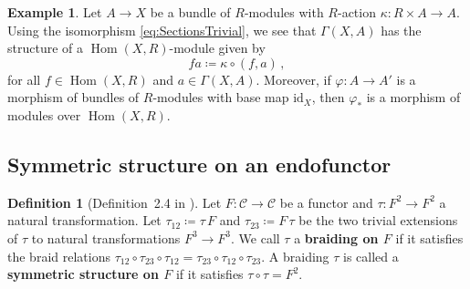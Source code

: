 \documentclass[12pt,reqno, a4paper]{amsart}
\numberwithin{equation}{section}
\theoremstyle{plain}
\theoremstyle{definition}
\newtheorem{Definition}[Theorem]{Definition}
\newtheorem{Example}[Theorem]{Example}
\theoremstyle{remark}
\DeclareMathOperator{\Hom}{Hom}
\newcommand{\calC}{\mathcal{C}}
\newcommand{\id}{\mathrm{id}}
\newcommand{\pr}{\mathrm{pr}}
\renewcommand{\phi}{\varphi}
\begin{document}
\begin{Example}
Let $A \to X$ be a bundle of $R$-modules with $R$-action $\kappa: R \times A \to A$. Using the isomorphism \eqref{eq:SectionsTrivial}, we see that $\Gamma(X,A)$ has the structure of a $\Hom(X,R)$-module given by
\begin{equation}
\label{eq:SectionsModuleStr}
  fa \coloneqq \kappa \circ (f,a) \,,
\end{equation}
for all $f \in \Hom(X,R)$ and $a \in \Gamma(X,A)$. Moreover, if $\phi: A \to A'$ is a morphism of bundles of $R$-modules with base map $\id_X$, then $\phi_*$ is a morphism of modules over $\Hom(X,R)$.
\end{Example}



\subsection{Symmetric structure on an endofunctor}




\begin{Definition}[Definition~2.4 in \cite{AintablianBlohmann:2026}]
\label{def:SymStruc}
Let $F: \calC \to \calC$ be a functor and $\tau: F^2 \to F^2$ a natural transformation. Let $\tau_{12} \coloneqq \tau\,F$ and $\tau_{23}\coloneqq F\,\tau$ be the two trivial extensions of $\tau$ to natural transformations $F^3 \to F^3$. We call $\tau$ a \textbf{braiding on $F$} if it satisfies the braid relations $\tau_{12} \circ \tau_{23} \circ \tau_{12} = \tau_{23} \circ \tau_{12} \circ \tau_{23}$. A braiding $\tau$ is called a \textbf{symmetric structure on $F$} if it satisfies $\tau\circ \tau = F^2$.
\end{Definition}
\end{document}

